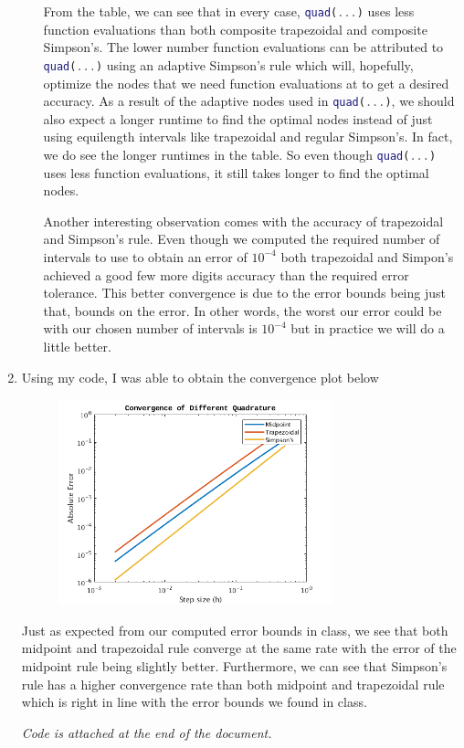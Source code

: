 \documentclass[a4paper,12pt]{article}
\begin{document}
\begin{enumerate}[label = \arabic*)]
\begin{enumerate}[label = (\alph*)]
		From the table, we can see that in every case, \lstinline[language = matlab]!quad(...)! uses less function evaluations than both composite trapezoidal and composite Simpson's. The lower number function evaluations can be attributed to \lstinline[language = matlab]!quad(...)! using an adaptive Simpson's rule which will, hopefully, optimize the nodes that we need function evaluations at to get a desired accuracy. As a result of the adaptive nodes used in \lstinline[language = matlab]!quad(...)!, we should also expect a longer runtime to find the optimal nodes instead of just using equilength intervals like trapezoidal and regular Simpson's. In fact, we do see the longer runtimes in the table. So even though \lstinline[language = matlab]!quad(...)! uses less function evaluations, it still takes longer to find the optimal nodes. 
		
		Another interesting observation comes with the accuracy of trapezoidal and Simpson's rule. Even though we computed the required number of intervals to use to obtain an error of $ 10^{-4} $ both trapezoidal and Simpon's achieved a good few more digits accuracy than the required error tolerance. This better convergence is due to the error bounds being just that, bounds on the error. In other words, the worst our error could be with our chosen number of intervals is $ 10^{-4} $ but in practice we will do a little better.
	\end{enumerate}

	\item Using my code, I was able to obtain the convergence plot below
	\begin{figure}[h!]
		\centering
		\includegraphics[width = 0.75\textwidth]{images/Convergence.png}
	\end{figure}
	
	Just as expected from our computed error bounds in class, we see that both midpoint and trapezoidal rule converge at the same rate with the error of the midpoint rule being slightly better. Furthermore, we can see that Simpson's rule has a higher convergence rate than both midpoint and trapezoidal rule which is right in line with the error bounds we found in class.
	
	\begin{center}
		\emph{Code is attached at the end of the document.}
	\end{center}
\end{enumerate}
\end{document}
